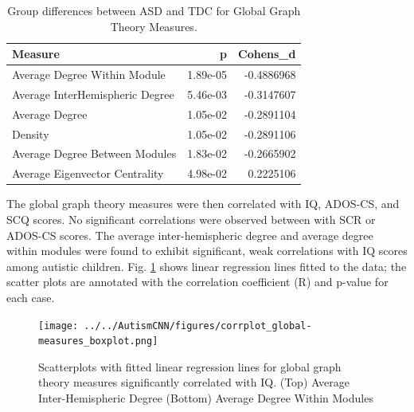 \documentclass[10pt,conference]{IEEEtran}
\begin{document}
    \begin{table}
        \caption{Group differences between ASD and TDC for Global Graph Theory Measures.}
        \begin{center}
            \begin{tabular}{lrr}
                \toprule
                Measure & p & Cohens\_d\\
                \midrule
                Average Degree Within Module & 1.89e-05 & -0.4886968\\
                Average InterHemispheric Degree & 5.46e-03 & -0.3147607\\
                Average Degree & 1.05e-02 & -0.2891104\\
                Density & 1.05e-02 & -0.2891106\\
                Average Degree Between Modules & 1.83e-02 & -0.2665902\\
                Average Eigenvector Centrality & 4.98e-02 & 0.2225106\\
                \bottomrule
            \end{tabular}
            \label{group-diff-global-measures}
        \end{center}
    \end{table}

    The global graph theory measures were then correlated with IQ, ADOS-CS, and SCQ scores.
    No significant correlations were observed between with SCR or ADOS-CS scores. The
    average inter-hemispheric degree and average degree within modules were found to 
    exhibit significant, weak correlations with IQ scores among autistic children.
    Fig. \ref{corrplot-global-measures} shows linear regression lines fitted to the data;
    the scatter plots are annotated with the correlation coefficient (R) and p-value for
    each case.

    \begin{figure}[ht]
        \vskip 0.2in
        \begin{center}
            \centerline{\texttt{[image: ../../AutismCNN/figures/corrplot\_global-measures\_boxplot.png]}}
            \caption{
                Scatterplots with fitted linear regression lines for global graph theory 
                measures significantly correlated with IQ. (Top) Average Inter-Hemispheric 
                Degree  (Bottom) Average Degree Within Modules
            }
            \label{corrplot-global-measures}
        \end{center}
        \vskip -0.2in
    \end{figure}
\end{document}
